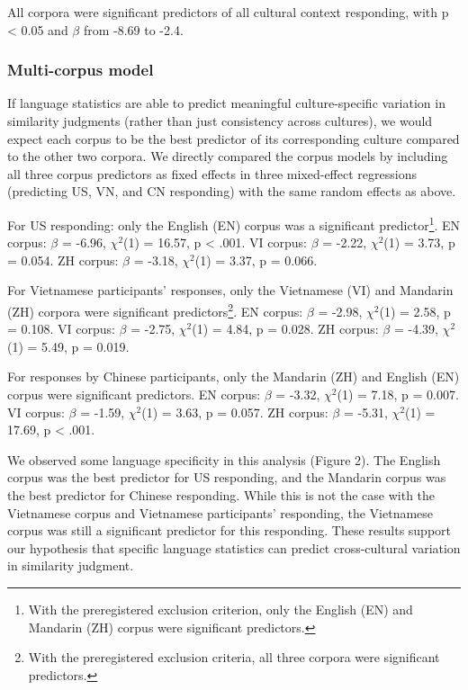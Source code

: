 \documentclass[10pt, letterpaper]{article}
\begin{document}
All corpora were significant predictors of all cultural context
responding, with p \textless{} 0.05 and \(\beta\) from -8.69 to -2.4.

\hypertarget{multi-corpus-model}{%
\subsubsection{Multi-corpus model}\label{multi-corpus-model}}

If language statistics are able to predict meaningful culture-specific
variation in similarity judgments (rather than just consistency across
cultures), we would expect each corpus to be the best predictor of its
corresponding culture compared to the other two corpora. We directly
compared the corpus models by including all three corpus predictors as
fixed effects in three mixed-effect regressions (predicting US, VN, and
CN responding) with the same random effects as above.

For US responding: only the English (EN) corpus was a significant
predictor\footnote{With the preregistered exclusion criterion, only the
  English (EN) and Mandarin (ZH) corpus were significant predictors.}.
EN corpus: \(\beta\) = -6.96, \(\chi^2\)(1) = 16.57, p \textless{} .001.
VI corpus: \(\beta\) = -2.22, \(\chi^2\)(1) = 3.73, p = 0.054. ZH
corpus: \(\beta\) = -3.18, \(\chi^2\)(1) = 3.37, p = 0.066.

For Vietnamese participants' responses, only the Vietnamese (VI) and
Mandarin (ZH) corpora were significant predictors\footnote{With the
  preregistered exclusion criteria, all three corpora were significant
  predictors.}. EN corpus: \(\beta\) = -2.98, \(\chi^2\)(1) = 2.58, p =
0.108. VI corpus: \(\beta\) = -2.75, \(\chi^2\)(1) = 4.84, p = 0.028. ZH
corpus: \(\beta\) = -4.39, \(\chi^2\)(1) = 5.49, p = 0.019.

For responses by Chinese participants, only the Mandarin (ZH) and
English (EN) corpus were significant predictors. EN corpus: \(\beta\) =
-3.32, \(\chi^2\)(1) = 7.18, p = 0.007. VI corpus: \(\beta\) = -1.59,
\(\chi^2\)(1) = 3.63, p = 0.057. ZH corpus: \(\beta\) = -5.31,
\(\chi^2\)(1) = 17.69, p \textless{} .001.

We observed some language specificity in this analysis (Figure 2). The
English corpus was the best predictor for US responding, and the
Mandarin corpus was the best predictor for Chinese responding. While
this is not the case with the Vietnamese corpus and Vietnamese
participants' responding, the Vietnamese corpus was still a significant
predictor for this responding. These results support our hypothesis that
specific language statistics can predict cross-cultural variation in
similarity judgment.
\end{document}
